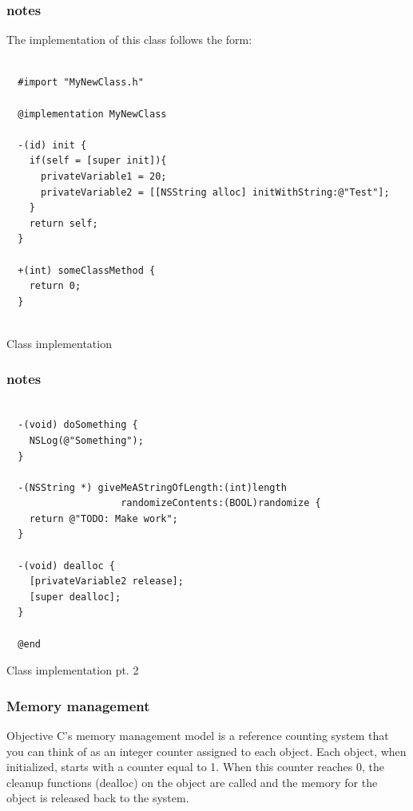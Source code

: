 \documentclass[10pt]{beamer}
\begin{document}
\begin{frame}[fragile]
  \frametitle{notes}
  The implementation of this class follows the form:
\begin{listing}[H]
    \begin{verbatim}

  #import "MyNewClass.h"

  @implementation MyNewClass

  -(id) init {
    if(self = [super init]){
      privateVariable1 = 20;
      privateVariable2 = [[NSString alloc] initWithString:@"Test"];
    }
    return self;
  }

  +(int) someClassMethod {
    return 0;
  }


  \end{verbatim}
    \caption{Class implementation}
    \label{listing:7}
  \end{listing}

\end{frame}

\begin{frame}[fragile]
  \frametitle{notes}
  \begin{listing}[H]
    \begin{verbatim}

  -(void) doSomething {
    NSLog(@"Something");
  }

  -(NSString *) giveMeAStringOfLength:(int)length
                    randomizeContents:(BOOL)randomize {
    return @"TODO: Make work";
  }

  -(void) dealloc {
    [privateVariable2 release];
    [super dealloc];
  }

  @end

  \end{verbatim}
    \caption{Class implementation pt. 2}
    \label{listing:8}
  \end{listing}

\end{frame}

    
\begin{frame}[fragile]
  \frametitle{Memory management}
  Objective C's memory management model is a reference counting system that you can think of as an integer counter assigned to each object. Each object, when initialized, starts with a counter equal to 1.  When this counter reaches 0, the cleanup functions (dealloc) on the object are called and the memory for the object is released back to the system.

\end{frame}
\end{document}
